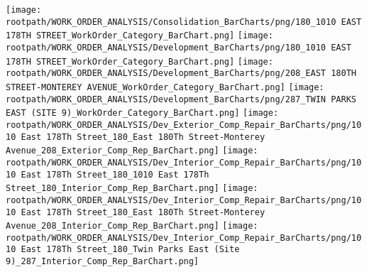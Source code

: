 \texttt{[image: \\rootpath/WORK\_ORDER\_ANALYSIS/Consolidation\_BarCharts/png/180\_1010 EAST 178TH STREET\_WorkOrder\_Category\_BarChart.png]}
\texttt{[image: \\rootpath/WORK\_ORDER\_ANALYSIS/Development\_BarCharts/png/180\_1010 EAST 178TH STREET\_WorkOrder\_Category\_BarChart.png]}
\texttt{[image: \\rootpath/WORK\_ORDER\_ANALYSIS/Development\_BarCharts/png/208\_EAST 180TH STREET-MONTEREY AVENUE\_WorkOrder\_Category\_BarChart.png]}
\texttt{[image: \\rootpath/WORK\_ORDER\_ANALYSIS/Development\_BarCharts/png/287\_TWIN PARKS EAST (SITE 9)\_WorkOrder\_Category\_BarChart.png]}
\texttt{[image: \\rootpath/WORK\_ORDER\_ANALYSIS/Dev\_Exterior\_Comp\_Repair\_BarCharts/png/1010 East 178Th Street\_180\_East 180Th Street-Monterey Avenue\_208\_Exterior\_Comp\_Rep\_BarChart.png]}
\texttt{[image: \\rootpath/WORK\_ORDER\_ANALYSIS/Dev\_Interior\_Comp\_Repair\_BarCharts/png/1010 East 178Th Street\_180\_1010 East 178Th Street\_180\_Interior\_Comp\_Rep\_BarChart.png]}
\texttt{[image: \\rootpath/WORK\_ORDER\_ANALYSIS/Dev\_Interior\_Comp\_Repair\_BarCharts/png/1010 East 178Th Street\_180\_East 180Th Street-Monterey Avenue\_208\_Interior\_Comp\_Rep\_BarChart.png]}
\texttt{[image: \\rootpath/WORK\_ORDER\_ANALYSIS/Dev\_Interior\_Comp\_Repair\_BarCharts/png/1010 East 178Th Street\_180\_Twin Parks East (Site 9)\_287\_Interior\_Comp\_Rep\_BarChart.png]}
